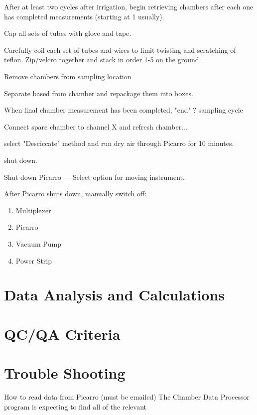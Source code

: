 \documentclass[12pt]{../SOP3}\usepackage[]{graphicx}\usepackage[]{color}
\begin{document}
\NP After at least two cycles after irrigation, begin retrieving chambers after each one has completed measurements (starting at 1 usually).
                               
\NP Cap all sets of tubes with glove and tape.
                               
\NP Carefully coil each set of tubes and wires to limit twisting and scratching of teflon. Zip/velcro together and stack in order 1-5 on the ground. 
                               
\NP Remove chambers from sampling location
                               
\NP Separate based from chamber and repackage them into boxes.
                               
\NP When final chamber measurement has been completed, "end" ? sampling cycle
                               
\NP Connect spare chamber to channel X and refresh chamber... 
                               
\NP select "Desciccate" method and run dry air through Picarro for 10 minutes.
                               
\NP shut down.
                               
\NP Shut down Picarro --- Select option for moving instrument.
                               
\NP After Picarro shuts down, manually switch off:

\begin{enumerate}
  \item Multiplexer
  \item Picarro
  \item Vacuum Pump
  \item Power Strip
\end{enumerate}
                               
\section{Data Analysis and Calculations}


\section{QC/QA Criteria}


\section{Trouble Shooting}
How to read data from Picarro (must be emailed)
The Chamber Data Processor program is expecting to find all of the relevant 
\end{document}
